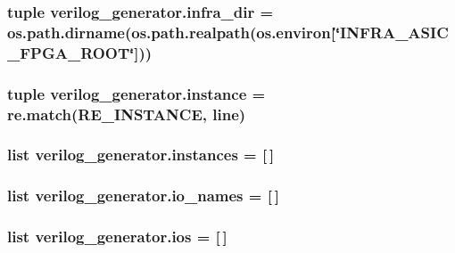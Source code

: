 \hypertarget{namespaceverilog__generator_ad90475de491c58d1bd0962f20cb9b26a}{
\subsubsection[{infra\-\_\-dir}]{\setlength{\rightskip}{0pt plus 5cm}tuple verilog\-\_\-generator.\-infra\-\_\-dir = os.\-path.\-dirname(os.\-path.\-realpath(os.\-environ\mbox{[}\char`\"{}I\-N\-F\-R\-A\-\_\-\-A\-S\-I\-C\-\_\-\-F\-P\-G\-A\-\_\-\-R\-O\-O\-T\char`\"{}\mbox{]}))}}\label{namespaceverilog__generator_ad90475de491c58d1bd0962f20cb9b26a}
\hypertarget{namespaceverilog__generator_a90dad455f6c0ec9127df51647fb1380f}{
\subsubsection[{instance}]{\setlength{\rightskip}{0pt plus 5cm}tuple verilog\-\_\-generator.\-instance = re.\-match({\bf R\-E\-\_\-\-I\-N\-S\-T\-A\-N\-C\-E}, line)}}\label{namespaceverilog__generator_a90dad455f6c0ec9127df51647fb1380f}
\hypertarget{namespaceverilog__generator_abfdc641e6360d79d9e9df91867d89549}{
\subsubsection[{instances}]{\setlength{\rightskip}{0pt plus 5cm}list verilog\-\_\-generator.\-instances = \mbox{[}$\,$\mbox{]}}}\label{namespaceverilog__generator_abfdc641e6360d79d9e9df91867d89549}
\hypertarget{namespaceverilog__generator_a729e0a8bec14b9a53a961013b1c6b10d}{
\subsubsection[{io\-\_\-names}]{\setlength{\rightskip}{0pt plus 5cm}list verilog\-\_\-generator.\-io\-\_\-names = \mbox{[}$\,$\mbox{]}}}\label{namespaceverilog__generator_a729e0a8bec14b9a53a961013b1c6b10d}
\hypertarget{namespaceverilog__generator_ade554169d988ab15567d5895be125e8a}{
\subsubsection[{ios}]{\setlength{\rightskip}{0pt plus 5cm}list verilog\-\_\-generator.\-ios = \mbox{[}$\,$\mbox{]}}}\label{namespaceverilog__generator_ade554169d988ab15567d5895be125e8a}
